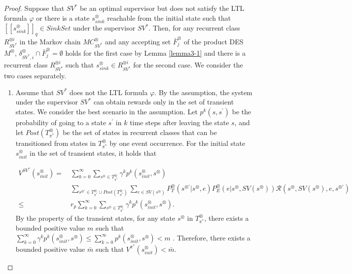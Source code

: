 \documentclass[10pt]{article}
\newtheorem{proof}{Proof}
\newcommand{\myspqsink}{\ensuremath{[\![s^{\otimes}_{sink}]\!]}_q}
\begin{document}
\begin{proof}
  Suppose that $SV^{\ast}$ be an optimal supervisor but does not satisfy the LTL formula $\varphi$ or there is  a state $s^{\otimes}_{sink}$ reachable from the initial state such that $\myspqsink \in SinkSet$ under the supervisor $SV^{\ast}$. Then, for any recurrent class $R^{\otimes i}_{{SV}^{\ast}}$ in the Markov chain $MC^{\otimes}_{{SV}^{\ast}}$ and any accepting set $\bar{F}^{\otimes}_j$ of the product DES $M^{\otimes}$,  $\delta^{\otimes}_{SV^{\ast},i} \cap \bar{F}^{\otimes}_j = \emptyset$
  holds for the first case by Lemma \ref{lemma3-1} and there is a recurrent class $R^{\otimes i}_{SV^{\ast}}$ such that $s^{\otimes}_{sink} \in R^{\otimes i}_{SV^{\ast}}$ for the second case. We consider the two cases separately.

 \begin{enumerate}
  \item Assume that $SV^{\ast}$ does not the LTL formula $\varphi$.
  By the assumption, the system under the supervisor $SV^{\ast}$ can obtain rewards only in the set of transient states. We consider the best scenario in the assumption. Let $p^k(s,s^{\prime})$ be the probability of going to a state $s^{\prime}$ in $k$ time steps after leaving the state $s$, and let $Post(T^{\otimes}_{\pi^{\ast}})$ be the set of states in recurrent classes that can be transitioned from states in $T^{\otimes}_{\pi^{\ast}}$ by one event occurrence. For the initial state $s^{\otimes}_{init}$ in the set of transient states, it holds that

  \begin{align}
    V^{SV^{\ast}}\!(s^{\otimes}_{init})
     =\ & \sum_{k=0}^{\infty} \sum_{s^{\otimes} \in T^{\otimes}_{\pi^{\ast}}} \gamma^k p^k(s^{\otimes}_{init}, s^{\otimes}) \nonumber \\
     & \sum_{s^{\otimes \prime} \in T^{\otimes}_{\pi^{\ast}} \cup Post(T^{\otimes}_{\pi^{\ast}})}  \sum_{e \in SV(s^{\otimes})} P^{\otimes}_T (s^{\otimes \prime} | s^{\otimes}, e) P^{\otimes}_E (e | s^{\otimes}, SV(s^{\otimes})) \mathcal{R}(s^{\otimes}, SV(s^{\otimes}), e, s^{\otimes \prime})\nonumber \\
     \leq\ & r_p \sum_{k=0}^{\infty} \sum_{s^{\otimes} \in T^{\otimes}_{\pi^{\ast}}} \gamma^k p^k(s^{\otimes}_{init}, s^{\otimes}). \nonumber
  \label{eqth11}
  \end{align}
  By the property of the transient states, for any state $s^{\otimes}$ in $T^{\otimes}_{\pi^{\ast}}$, there exists a bounded positive value $m$ such that $ \sum_{k=0}^{\infty} \gamma^k p^k(s^{\otimes}_{init}, s^{\otimes}) \leq \sum_{k=0}^{\infty} p^k(s^{\otimes}_{init}, s^{\otimes}) < m$ \cite{ESS}. Therefore, there exists a bounded positive value $\bar{m}$ such that $V^{\pi^{\ast}}(s^{\otimes}_{init}) < \bar{m}$.


\end{enumerate}
\end{proof}
\end{document}
